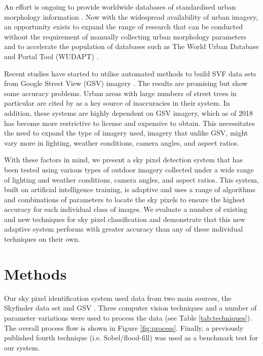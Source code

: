 \documentclass[final,3p,times,authoryear]{elsarticle}
\begin{document}
An effort is ongoing to provide worldwide databases of standardised urban morphology information \citep{Ching2019,Ching2018}. Now with the widespread availability of urban imagery, an opportunity exists to expand the range of research that can be conducted without the requirement of manually collecting urban morphology parameters and to accelerate the population of databases such as The World Urban Database and Portal Tool (WUDAPT) \citep{Mills2015}.

Recent studies have started to utilise automated methods to build SVF data sets from Google Street View (GSV) imagery \citep{Middel2018,Gong2018}. The results are promising but show some accuracy problems. Urban areas with large numbers of street trees in particular are cited by \cite{Gong2018} as a key source of inaccuracies in their system. In addition, these systems are highly dependent on GSV imagery, which as of 2018 has become more restrictive to license and expensive to obtain. This necessitates the need to expand the type of imagery used, imagery that unlike GSV, might vary more in lighting, weather conditions, camera angles, and aspect ratios. 

With these factors in mind, we present a sky pixel detection system that has been tested using various types of outdoor imagery collected under a wide range of lighting and weather conditions, camera angles, and aspect ratios. This system, built on artificial intelligence training, is adaptive and uses a range of algorithms and combinations of parameters to locate the sky pixels to ensure the highest accuracy for each individual class of images. We evaluate a number of existing and new techniques for sky pixel classification and demonstrate that this new adaptive system performs with greater accuracy than any of these individual techniques on their own.



\section{Methods}\label{sec:Methods}
Our sky pixel identification system used data from two main sources, the Skyfinder data set \citep{Mihail2016} and GSV \citep{GoogleMaps2017b}. Three computer vision techniques and a number of parameter variations were used to process the data (see Table \ref{tab:techniques}). The overall process flow is shown in Figure \ref{fig:process}. Finally, a previously published fourth technique (i.e. Sobel/flood-fill) was used as a benchmark test for our system.
\end{document}
